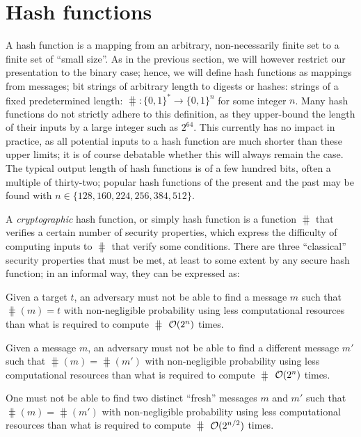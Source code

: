 \section{Hash functions}
\label{sec:intro}

A hash function is a mapping from an arbitrary, non-necessarily finite set to a finite set of ``small size''. As in the previous section, we will however
restrict our presentation to the binary case; hence, we will define hash functions as
mappings from messages; bit strings of arbitrary length to digests or hashes: strings of a fixed predetermined length:
$\hash : \{0,1\}^* \rightarrow \{0,1\}^n$ for some integer $n$.
Many hash functions do not strictly adhere to this definition, as they upper-bound the length of their inputs by a large integer such as $2^{64}$. This currently has
no impact in practice, as all potential inputs to a hash function are much shorter than these upper limits; it is of course debatable whether this will always remain the case. 
The typical output length of hash functions is of a few hundred bits, often a multiple of thirty-two; popular hash functions of the present and the past may be found with
$n \in \{128, 160, 224, 256, 384, 512\}$.

A \emph{cryptographic} hash function, or simply hash function is a function $\hash$ that verifies a certain number of security properties, which express the difficulty of computing inputs
to $\hash$ that verify some conditions. There are three ``classical'' security properties that must be met, at least to some extent
by any secure hash function; in an informal way, they can be expressed as:
\begin{defi} Given a target $t$, an adversary must not be able to find a message $m$ such that $\hash(m) = t$ with non-negligible probability using
less computational resources than what is required to compute $\hash$ $\operatorname{\mathcal{O}}(2^n)$ times.
\label{def:pre}
\end{defi}
\begin{defi} Given a message $m$, an adversary must not be able to find a different message $m'$ such that
$\hash(m) = \hash(m')$  with non-negligible probability using less computational resources than what is required to compute $\hash$ $\operatorname{\mathcal{O}}(2^n)$ times.
\label{def:2pre}
\end{defi}
\begin{defi} One must not be able to find two distinct ``fresh'' messages $m$ and $m'$ such that $\hash(m) =
\hash(m')$ with non-negligible probability using less computational resources than what is required to compute $\hash$ $\operatorname{\mathcal{O}}(2^{n/2})$ times.
\label{def:coll}
\end{defi}

